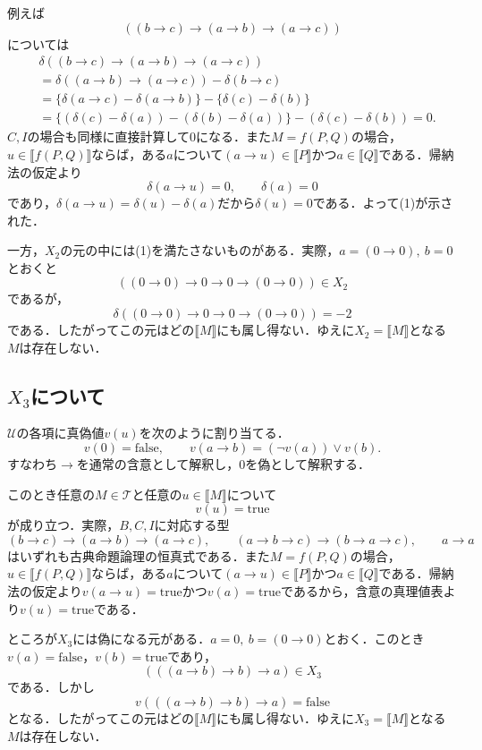 \documentclass{jsarticle}
\begin{document}
例えば
\[
  ((b\to c)\to(a\to b)\to(a\to c))
\]
については
\[
\begin{aligned}
&\delta((b\to c)\to(a\to b)\to(a\to c)) \\
&=\delta((a\to b)\to(a\to c))-\delta(b\to c) \\
&=\{\delta(a\to c)-\delta(a\to b)\}-\{\delta(c)-\delta(b)\} \\
&=\{(\delta(c)-\delta(a))-(\delta(b)-\delta(a))\}-(\delta(c)-\delta(b))=0.
\end{aligned}
\]
$C,I$の場合も同様に直接計算して$0$になる．また$M=f(P,Q)$の場合，$u\in\llbracket f(P,Q)\rrbracket$ならば，ある$a$について$(a\to u)\in\llbracket P\rrbracket$かつ$a\in\llbracket Q\rrbracket$である．帰納法の仮定より
\[
  \delta(a\to u)=0,
  \qquad
  \delta(a)=0
\]
であり，$\delta(a\to u)=\delta(u)-\delta(a)$だから$\delta(u)=0$である．よって(1)が示された．

一方，$X_2$の元の中には(1)を満たさないものがある．実際，$a=(0\to0),\ b=0$とおくと
\[
  ((0\to0)\to0\to0\to(0\to0))\in X_2
\]
であるが，
\[
  \delta((0\to0)\to0\to0\to(0\to0))=-2
\]
である．したがってこの元はどの$\llbracket M\rrbracket$にも属し得ない．ゆえに$X_2=\llbracket M\rrbracket$となる$M$は存在しない．

\subsection*{$X_3$について}

$\mathcal U$の各項に真偽値$v(u)$を次のように割り当てる．
\[
  v(0)=\mathrm{false},
  \qquad
  v(a\to b)=(\neg v(a))\lor v(b).
\]
すなわち$\to$を通常の含意として解釈し，$0$を偽として解釈する．

このとき任意の$M\in\mathcal T$と任意の$u\in\llbracket M\rrbracket$について
\[
  v(u)=\mathrm{true}
\tag{2}
\]
が成り立つ．実際，$B,C,I$に対応する型
\[
  (b\to c)\to(a\to b)\to(a\to c),
  \qquad
  (a\to b\to c)\to(b\to a\to c),
  \qquad
  a\to a
\]
はいずれも古典命題論理の恒真式である．また$M=f(P,Q)$の場合，$u\in\llbracket f(P,Q)\rrbracket$ならば，ある$a$について$(a\to u)\in\llbracket P\rrbracket$かつ$a\in\llbracket Q\rrbracket$である．帰納法の仮定より$v(a\to u)=\mathrm{true}$かつ$v(a)=\mathrm{true}$であるから，含意の真理値表より$v(u)=\mathrm{true}$である．

ところが$X_3$には偽になる元がある．$a=0,\ b=(0\to0)$とおく．このとき$v(a)=\mathrm{false}$，$v(b)=\mathrm{true}$であり，
\[
  (((a\to b)\to b)\to a)
  \in X_3
\]
である．しかし
\[
  v(((a\to b)\to b)\to a)=\mathrm{false}
\]
となる．したがってこの元はどの$\llbracket M\rrbracket$にも属し得ない．ゆえに$X_3=\llbracket M\rrbracket$となる$M$は存在しない．
\end{document}
